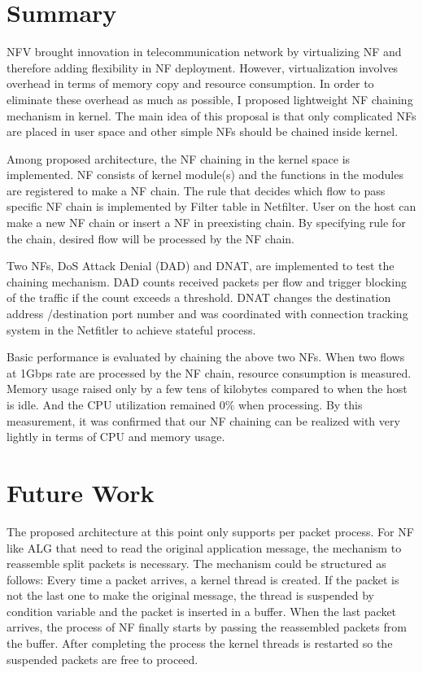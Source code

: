 \section{Summary}
NFV brought innovation in telecommunication network by virtualizing NF and therefore adding flexibility in NF deployment. However, virtualization involves overhead in terms of memory copy and resource consumption. In order to eliminate these overhead as much as possible, I proposed lightweight NF chaining mechanism in kernel. The main idea of this proposal is that only complicated NFs are placed in user space and other simple NFs should be chained inside kernel. 

Among proposed architecture, the NF chaining in the kernel space is implemented. NF consists of kernel module(s) and the functions in the modules are registered to make a NF chain. The rule that decides which flow to pass specific NF chain is implemented by Filter table in Netfilter. User on the host can make a new NF chain or insert a NF in preexisting chain. By specifying rule for the chain, desired flow will be processed by the NF chain. 

Two NFs, DoS Attack Denial (DAD) and DNAT, are implemented to test the chaining mechanism. DAD counts received packets per flow and trigger blocking of the traffic if the count exceeds a threshold. DNAT changes the destination address /destination port number and was coordinated with connection tracking system in the Netfitler to achieve stateful process. 

Basic performance is evaluated by chaining the above two NFs. When two flows at 1Gbps rate are processed by the NF chain, resource consumption is measured. Memory usage raised only by a few tens of kilobytes compared to when the host is idle. And the CPU utilization remained 0\% when processing. By this measurement, it was confirmed that our NF chaining can be realized with very lightly in terms of CPU and memory usage. 

\section{Future Work}
The proposed architecture at this point only supports per packet process. For NF like ALG that need to read the original application message, the mechanism to reassemble split packets is necessary. The mechanism could be structured as follows: Every time a packet arrives, a kernel thread is created. If the packet is not the last one to make the original message, the thread is suspended by condition variable and the packet is inserted in a buffer. When the last packet arrives, the process of NF finally starts by passing the reassembled packets from the buffer. After completing the process the kernel threads is restarted so the suspended packets are free to proceed. 